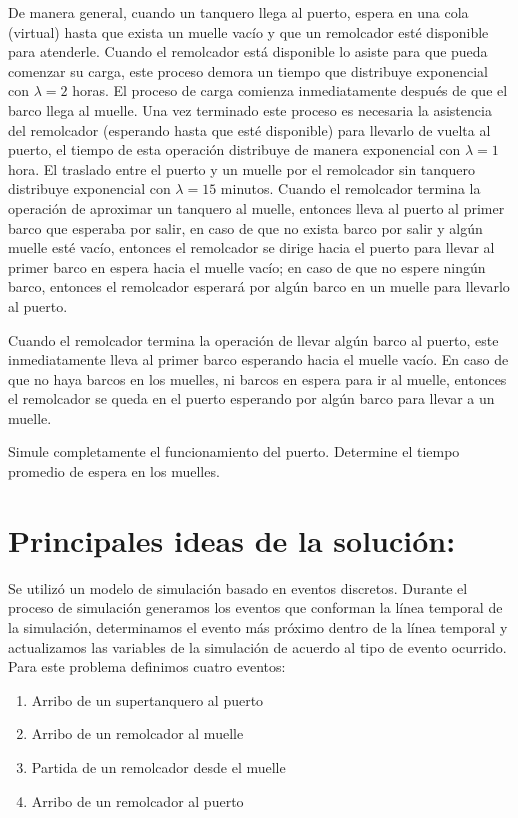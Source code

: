 \documentclass[titlepage,11pt]{scrartcl}
\begin{document}
	De manera general, cuando un tanquero llega al puerto, espera en una cola (virtual) hasta que exista un muelle vacío y que un remolcador esté disponible para atenderle. Cuando el remolcador está disponible lo asiste para que pueda comenzar su carga, este proceso demora un tiempo que distribuye exponencial con $\lambda = 2$ horas. El proceso de carga comienza inmediatamente después de que el barco llega al muelle. Una vez terminado este proceso es necesaria la asistencia del remolcador (esperando hasta que esté disponible) para llevarlo de vuelta al puerto, el tiempo de esta operación distribuye de manera exponencial con $\lambda = 1$ hora. El traslado entre el puerto y un muelle por el remolcador sin tanquero distribuye exponencial con $\lambda = 15$ minutos. Cuando el remolcador termina la operación de aproximar un tanquero al muelle, entonces lleva al puerto al primer barco que esperaba por salir, en caso de que no exista barco por salir y algún muelle esté vacío, entonces el remolcador se dirige hacia el puerto para llevar al primer barco en espera hacia el muelle vacío; en caso de que no espere ningún barco, entonces el remolcador esperará por algún barco en un muelle para llevarlo al puerto. 
	
	Cuando el remolcador termina la operación de llevar algún barco al puerto, este inmediatamente lleva al primer barco esperando hacia el muelle vacío. En caso de que no haya barcos en los muelles, ni barcos en espera para ir al muelle, entonces el remolcador se queda en el puerto esperando por algún barco para llevar a un muelle. 
	
	Simule completamente el funcionamiento del puerto. Determine el tiempo promedio de espera en los muelles.

\section{Principales ideas de la soluci\'on:}

    Se utiliz\'o un modelo de simulaci\'on basado en eventos discretos.
    Durante el proceso de simulaci\'on generamos los eventos que conforman la l\'inea temporal de la simulaci\'on,
    determinamos el evento m\'as pr\'oximo dentro de la l\'inea temporal y actualizamos las variables de la simulaci\'on de acuerdo al tipo de evento ocurrido.\\
    Para este problema definimos cuatro eventos:
	
	\begin{enumerate}
		\item Arribo de un supertanquero al puerto
		\item Arribo de un remolcador al muelle
		\item Partida de un remolcador desde el muelle
		\item Arribo de un remolcador al puerto
	\end{enumerate}
\end{document}
